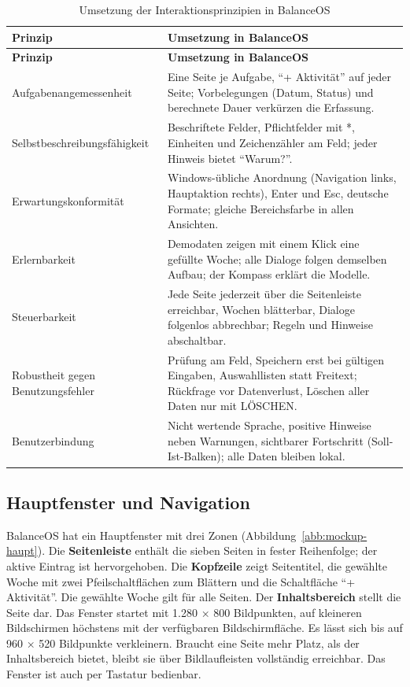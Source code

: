 \begin{longtable}{@{}L{3.6cm}L{12.0cm}@{}}
  \caption{Umsetzung der Interaktionsprinzipien in BalanceOS}\label{tab:interaktionsprinzipien}\\
  \toprule
  \textbf{Prinzip} & \textbf{Umsetzung in BalanceOS} \\
  \midrule
  \endfirsthead
  \toprule
  \textbf{Prinzip} & \textbf{Umsetzung in BalanceOS} \\
  \midrule
  \endhead
  \bottomrule
  \endfoot
  Aufgaben\-angemessenheit & Eine Seite je Aufgabe, \enquote{+ Aktivität} auf jeder Seite; Vorbelegungen (Datum, Status) und berechnete Dauer verkürzen die Erfassung. \\
  Selbstbeschreibungs\-fähigkeit & Beschriftete Felder, Pflichtfelder mit *, Einheiten und Zeichenzähler am Feld; jeder Hinweis bietet \enquote{Warum?}. \\
  Erwartungs\-konformität & Windows-übliche Anordnung (Navigation links, Hauptaktion rechts), Enter und Esc, deutsche Formate; gleiche Bereichsfarbe in allen Ansichten. \\
  Erlernbarkeit & Demodaten zeigen mit einem Klick eine gefüllte Woche; alle Dialoge folgen demselben Aufbau; der Kompass erklärt die Modelle. \\
  Steuerbarkeit & Jede Seite jederzeit über die Seitenleiste erreichbar, Wochen blätterbar, Dialoge folgenlos abbrechbar; Regeln und Hinweise abschaltbar. \\
  Robustheit gegen Benutzungs\-fehler & Prüfung am Feld, Speichern erst bei gültigen Eingaben, Auswahllisten statt Freitext; Rückfrage vor Datenverlust, Löschen aller Daten nur mit LÖSCHEN. \\
  Benutzerbindung & Nicht wertende Sprache, positive Hinweise neben Warnungen, sichtbarer Fortschritt (Soll-Ist-Balken); alle Daten bleiben lokal. \\
\end{longtable}

\subsection{Hauptfenster und Navigation}\label{sec:hauptfenster}
BalanceOS hat ein Hauptfenster mit drei Zonen (Abbildung~\ref{abb:mockup-haupt}). Die \textbf{Seitenleiste} enthält die sieben Seiten in fester Reihenfolge; der aktive Eintrag ist hervorgehoben. Die \textbf{Kopfzeile} zeigt Seitentitel, die gewählte Woche mit zwei Pfeilschaltflächen zum Blättern und die Schaltfläche \enquote{+ Aktivität}. Die gewählte Woche gilt für alle Seiten. Der \textbf{Inhaltsbereich} stellt die Seite dar. Das Fenster startet mit 1.280 × 800 Bildpunkten, auf kleineren Bildschirmen höchstens mit der verfügbaren Bildschirmfläche. Es lässt sich bis auf 960 × 520 Bildpunkte verkleinern. Braucht eine Seite mehr Platz, als der Inhaltsbereich bietet, bleibt sie über Bildlaufleisten vollständig erreichbar. Das Fenster ist auch per Tastatur bedienbar.

